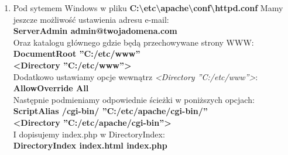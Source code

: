 \documentclass[a4paper,10pt]{article}
\begin{document}
\begin{enumerate}
\item Pod sytemem Windows w pliku \textbf{C:\textbackslash etc\textbackslash apache\textbackslash conf\textbackslash httpd.conf } Mamy jeszcze możliwość ustawienia adresu e-mail: \\
\textbf{ServerAdmin admin@twojadomena.com} \\
Oraz katalogu głównego gdzie będą przechowywane strony WWW: \\
\textbf{DocumentRoot ''C:/etc/www'' \\
<Directory ''C:/etc/www''>} \\
Dodatkowo ustawiamy opcje wewnątrz \textit{<Directory ''C:/etc/www''>}: \\
\textbf{AllowOverride All} \\
Następnie podmieniamy odpowiednie ścieżki w poniższych opcjach: \\
\textbf{ScriptAlias /cgi-bin/ ''C:/etc/apache/cgi-bin/'' \\
<Directory ''C:/etc/apache/cgi-bin''> \\}
I dopisujemy index.php w DirectoryIndex: \\
\textbf{DirectoryIndex index.html index.php}


\end{enumerate}
\end{document}
